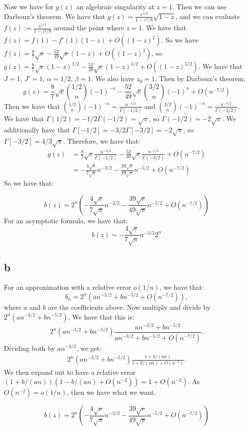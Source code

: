 \documentclass[]{article}
\theoremstyle{definition}
\numberwithin{theorem}{section}
\numberwithin{equation}{section}
\begin{document}
Now we have for $g(z)$ an algebraic singularity at $z = 1$. Then we can use Darboux's theorem. We have that $g(z) = \frac{e^{z/2}}{1 - z^3/8} \sqrt{1 - z}$, and we can evaluate $f(z) := \frac{e^{z/2}}{1 - z^3/8} $ around the point where $z = 1$. 
We have that $f(z) = f(1) - f'(1) (1 - z) + O((1 - z)^2)$. So we have $f(z) = \frac{8}{7}\sqrt{e} -  \frac{52}{49}\sqrt{e}(1-z) + O((1 - z)^2)$, so $g(z) = \frac{8}{7}\sqrt{e}(1 - z)^{1/2} -  \frac{52}{49}\sqrt{e}(1-z)^{3/2} + O((1 - z)^{5/2})$. 
We have that $J = 1$, $J' = 1$, $\alpha = 1/2$, $\beta = 1$. We also have $z_0 = 1$.
Then by Darboux's theorem, 
\begin{equation}
	[z^n] g(z) = \frac{8}{7}\sqrt{e} \binom{1/2}{n} (-1)^{-n} -  \frac{52}{49}\sqrt{e} \binom{3/2}{n}(-1)^n + O(n^{-7/2})
\end{equation}
Then we have that $\binom{1/2}{n} (-1)^{-n} = \frac{n^{-3/2}}{\Gamma(-1/2)}$ and  $\binom{3/2}{n} (-1)^{-n} = \frac{n^{-5/2}}{\Gamma(-3/2)}$. 
We have that $\Gamma(1/2) = -1/2 \Gamma(-1/2) = \sqrt{\pi}$, so $\Gamma(-1/2) = - 2 \sqrt{\pi}$. We additionally have that $\Gamma[-1/2] = -3/2 \Gamma[-3/2] = -2 \sqrt{\pi}$, so $\Gamma[-3/2] = 4/3 \sqrt{\pi}$. Therefore, we have that:
\begin{align*}
	[z^n] g(z) &= \frac{8}{7}\sqrt{e} \frac{n^{-3/2}}{\Gamma(-1/2)} -  \frac{52}{49}\sqrt{e} \frac{n^{-5/2}}{\Gamma(-3/2)} + O(n^{-7/2})\\
	&= -\frac{4 \sqrt{e}}{7 \sqrt{\pi}} n^{-3/2} - \frac{39 \sqrt{e}}{49\sqrt{\pi}} n^{-5/2} + O(n^{-7/2})
\end{align*}
So we have that:

\begin{equation}
	[z^n] b(z) = 2^n \left( -\frac{4 \sqrt{e}}{7 \sqrt{\pi}} n^{-3/2} - \frac{39 \sqrt{e}}{49\sqrt{\pi}} n^{-5/2} + O(n^{-7/2})\right)
\end{equation}
For an asymptotic formula, we have that:
\begin{equation}
	[z^n] b(z) \sim -\frac{4 \sqrt{e}}{7 \sqrt{\pi}} n^{-3/2} 2^n
\end{equation}
\subsection{b}
For an approximation with a relative error $o(1/n)$, we have that:
\begin{equation}
	b_n = 2^n ( a n^{-3/2} + b n^{-5/2} + O(n^{-7/2})),
\end{equation}
where $a$ and $b$ are the coefficients above. 
Now multiply and divide by $2^n(a n^{-3/2} + b n^{-5/2})$. We have that this is:
\begin{equation}
	2^n(a n^{-3/2} + b n^{-5/2}) \frac{a n^{-3/2} + b n^{-5/2}}{a n^{-3/2} + b n^{-5/2} + O(n^{-7/2})}.
\end{equation}
Dividing both by $a n^{-3/2}$, we get:
\begin{align*}
	2^n(a n^{-3/2} + b n^{-5/2}) \frac{1 + b/(an)}{1 + b/(an) + O(n^{-2})}.
\end{align*}
We then expand out to have a relative error $(1 + b/(an)) (1 -b/(an) + O(n^{-2})) = 1 + O(n^{-2})$. As $O(n^{-2})  = o(1/n)$, then we have what we want. 

\begin{equation}
	[z^n] b(z) = 2^n \left( -\frac{4 \sqrt{e}}{7 \sqrt{\pi}} n^{-3/2} - \frac{39 \sqrt{e}}{49\sqrt{\pi}} n^{-5/2} + O(n^{-7/2})\right)
\end{equation}
\end{document}
